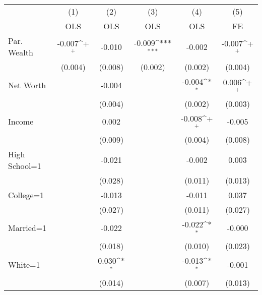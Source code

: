 {
\def\sym#1{\ifmmode^{#1}\else\(^{#1}\)\fi}
\begin{tabular}{l*{5}{c}}
\toprule
                &\multicolumn{1}{c}{(1)}&\multicolumn{1}{c}{(2)}&\multicolumn{1}{c}{(3)}&\multicolumn{1}{c}{(4)}&\multicolumn{1}{c}{(5)}\\
                &\multicolumn{1}{c}{OLS}&\multicolumn{1}{c}{OLS}&\multicolumn{1}{c}{OLS}&\multicolumn{1}{c}{OLS}&\multicolumn{1}{c}{FE}\\
\midrule
\;Par. Wealth   &   -0.007\sym{+}  &   -0.010         &   -0.009\sym{***}&   -0.002         &   -0.007\sym{+}  \\
                &  (0.004)         &  (0.008)         &  (0.002)         &  (0.002)         &  (0.004)         \\
\;Net Worth     &                  &   -0.004         &                  &   -0.004\sym{*}  &    0.006\sym{+}  \\
                &                  &  (0.004)         &                  &  (0.002)         &  (0.003)         \\
\;Income        &                  &    0.002         &                  &   -0.008\sym{+}  &   -0.005         \\
                &                  &  (0.009)         &                  &  (0.004)         &  (0.008)         \\
\;High School=1 &                  &   -0.021         &                  &   -0.002         &    0.003         \\
                &                  &  (0.028)         &                  &  (0.011)         &  (0.013)         \\
\;College=1     &                  &   -0.013         &                  &   -0.011         &    0.037         \\
                &                  &  (0.027)         &                  &  (0.011)         &  (0.027)         \\
\;Married=1     &                  &   -0.022         &                  &   -0.022\sym{*}  &   -0.000         \\
                &                  &  (0.018)         &                  &  (0.010)         &  (0.023)         \\
\;White=1       &                  &    0.030\sym{*}  &                  &   -0.013\sym{*}  &   -0.001         \\
                &                  &  (0.014)         &                  &  (0.007)         &  (0.013)         \\

\end{tabular}}
